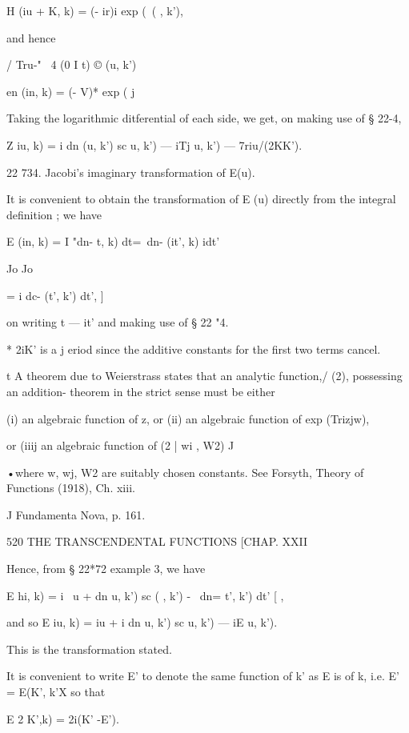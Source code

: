 H (iu + K, k) = (- ir)i exp (\   ( , k'), 



and hence 



/ Tru-" \  4 (0 I t) © (u, k') 



en (in, k) = (-  V)* exp (   j     



Taking the logarithmic ditferential of each side, we get, on making use of 
§ 22-4, 

Z  iu, k) = i dn (u, k') sc  u, k') — iTj  u, k') — 7riu/(2KK'). 

22 734. Jacobi's imaginary transformation of E(u). 

It is convenient to obtain the transformation of E (u) directly from the 
integral definition ; we have 

E (in, k) = I "dn-  t, k) dt=\ dn- (it', k) idt' 

Jo Jo 

= i dc- (t', k') dt', 
] 

on writing t — it' and making use of § 22 "4. 

* 2iK' is a j eriod since the additive constants for the first two terms cancel. 

t A theorem due to Weierstrass states that an analytic function,/ (2), possessing an addition- 
theorem in the strict sense must be either 

(i) an algebraic function of z, 
or (ii) an algebraic function of exp (Trizjw), 

or (iiij an algebraic function of   (2 | wi , W2) J 

•where w, wj, W2 are suitably chosen constants. See Forsyth, Theory of Functions (1918), Ch. xiii. 

J Fundamenta Nova, p. 161. 



520 THE TRANSCENDENTAL FUNCTIONS [CHAP. XXII 

Hence, from § 22*72 example 3, we have 

E  hi, k) = i \ u + dn  u, k') sc ( , k') - \ dn=  t', k') dt' [ , 

and so E  iu, k) = iu + i dn  u, k') sc  u, k') — iE  u, k'). 

This is the transformation stated. 

It is convenient to write E' to denote the same function of k' as E is of k, 
i.e. E' = E(K', k'X so that 

E 2 K',k) = 2i(K' -E'). 

